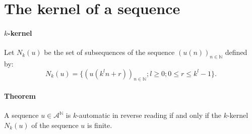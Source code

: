 \documentclass{article}
\begin{document}
\section*{The kernel of a sequence}
\paragraph{$k$-kernel} Let $N_k(u)$ be the set of subsequences of the sequence
$(u(n))_{n \in \mathbb{N}}$ defined by:
\begin{displaymath}
N_k(u) = \{(u(k^ln + r))_{n \in \mathbb{N}}; l \ge 0; 0 \le r \le k^l - 1\}.
\end{displaymath}

\paragraph{Theorem} A sequence $u \in \mathcal{A}^\mathbb{N}$ is $k$-automatic
in reverse reading if and only if the $k$-kernel $N_k(u)$ of the sequence $u$
is finite.
\end{document}
